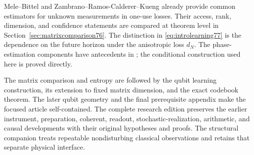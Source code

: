 Mele--Bittel \cite{MB67} and
Zambrano--Ramos-Calderer--Kueng \cite{ZRK76} already provide common
estimators for unknown measurements in one-use losses. Their access,
rank, dimension, and confidence statements are compared at theorem
level in Section~\ref{sec:matrixcomparison76}. The distinction in
\eqref{eq:introlearning77} is the dependence on the future horizon
under the anisotropic loss $d_N$. The phase-estimation components
have antecedents in \cite{HB76,KLY76}; the conditional construction
used here is proved directly.

The matrix comparison and entropy are followed by the qubit learning
construction, its extension to fixed matrix dimension, and the exact
codebook theorem. The later qubit geometry and the final prerequisite
appendix make the focused article self-contained. The complete
research edition preserves the earlier instrument, preparation,
coherent, readout, stochastic-realization, arithmetic, and causal
developments with their original hypotheses and proofs. The
structural companion treats repeatable nondisturbing classical
observations and retains that separate physical interface.
